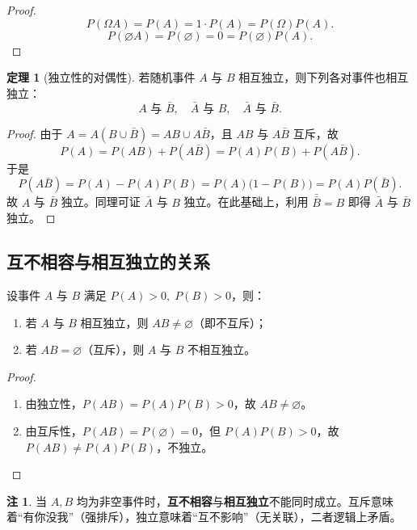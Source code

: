 \documentclass[11pt,a4paper]{report}
\theoremstyle{definition}
\newtheorem{note}{注}[chapter]
\newtheorem{theorem}{定理}[chapter]
\begin{document}
\begin{proof}
\[
P(\Omega A) = P(A) = 1 \cdot P(A) = P(\Omega)P(A).
\]
\[
P(\varnothing A) = P(\varnothing) = 0 = P(\varnothing)P(A).
\]
\end{proof}

\begin{theorem}[独立性的对偶性]
若随机事件 $A$ 与 $B$ 相互独立，则下列各对事件也相互独立：
\[
A \text{ 与 } \bar{B}, \quad \bar{A} \text{ 与 } B, \quad \bar{A} \text{ 与 } \bar{B}.
\]
\end{theorem}

\begin{proof}
由于 $A = A(B \cup \bar{B}) = AB \cup A\bar{B}$，且 $AB$ 与 $A\bar{B}$ 互斥，故
\[
P(A) = P(AB) + P(A\bar{B}) = P(A)P(B) + P(A\bar{B}).
\]
于是
\[
P(A\bar{B}) = P(A) - P(A)P(B) = P(A)\bigl(1-P(B)\bigr) = P(A)P(\bar{B}).
\]
故 $A$ 与 $\bar{B}$ 独立。同理可证 $\bar{A}$ 与 $B$ 独立。在此基础上，利用 $\bar{\bar{B}} = B$ 即得 $\bar{A}$ 与 $\bar{B}$ 独立。
\end{proof}

\subsection{互不相容与相互独立的关系}

设事件 $A$ 与 $B$ 满足 $P(A) > 0,\; P(B) > 0$，则：

\begin{enumerate}[label=(\arabic*),leftmargin=2em]
    \item 若 $A$ 与 $B$ 相互独立，则 $AB \neq \varnothing$（即不互斥）；
    \item 若 $AB = \varnothing$（互斥），则 $A$ 与 $B$ 不相互独立。
\end{enumerate}

\begin{proof}
\begin{enumerate}[label=(\arabic*),leftmargin=1em]
    \item 由独立性，$P(AB) = P(A)P(B) > 0$，故 $AB \neq \varnothing$。
    \item 由互斥性，$P(AB) = P(\varnothing) = 0$，但 $P(A)P(B) > 0$，故 $P(AB) \neq P(A)P(B)$，不独立。
\end{enumerate}
\end{proof}

\begin{note}
当 $A, B$ 均为非空事件时，\textbf{互不相容}与\textbf{相互独立}不能同时成立。互斥意味着``有你没我''（强排斥），独立意味着``互不影响''（无关联），二者逻辑上矛盾。
\end{note}
\end{document}

